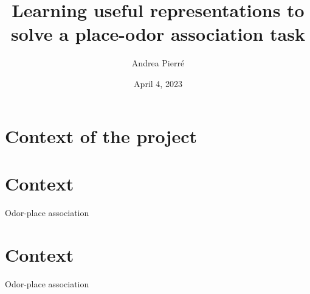 \documentclass[bigger]{beamer}
\author{Andrea Pierré}
\date{April 4, 2023}
\title{Learning useful representations to solve a place-odor association task}
\institute{Fleischmann Lab}
\begin{document}
\maketitle
\section{Context of the project}
\label{sec:org340210c}
\section*{Context}
\label{sec:orgecc459c}
{%
\begin{frame}[fragile]{Odor-place association}
\end{frame}
}
\section*{Context}
\label{sec:org7446d4d}
{%
\begin{frame}[fragile]{Odor-place association}
\addtocounter{framenumber}{-1}
\end{frame}
}
\end{document}

